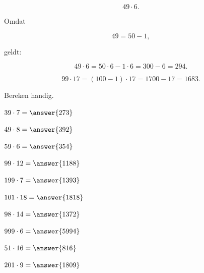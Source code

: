\documentclass{ximera}
\begin{document}

\begin{voorbeeld}

\[
49\cdot6.
\]

Omdat

\[
49=50-1,
\]

geldt:

\[
49\cdot6
=
50\cdot6-1\cdot6
=
300-6
=
294.
\]

\end{voorbeeld}


\begin{voorbeeld}

\[
99\cdot17
=
(100-1)\cdot17
=
1700-17
=
1683.
\]

\end{voorbeeld}


\begin{oefening}{\oefB\ESS}

Bereken handig.

\begin{question} \(39\cdot7=\answer{273}\) \end{question}

\begin{question} \(49\cdot8=\answer{392}\) \end{question}

\begin{question} \(59\cdot6=\answer{354}\) \end{question}

\begin{question} \(99\cdot12=\answer{1188}\) \end{question}

\begin{question} \(199\cdot7=\answer{1393}\) \end{question}

\begin{question} \(101\cdot18=\answer{1818}\) \end{question}

\begin{question} \(98\cdot14=\answer{1372}\) \end{question}

\begin{question} \(999\cdot6=\answer{5994}\) \end{question}

\begin{question} \(51\cdot16=\answer{816}\) \end{question}

\begin{question} \(201\cdot9=\answer{1809}\) \end{question}

\end{oefening}
\end{document}
